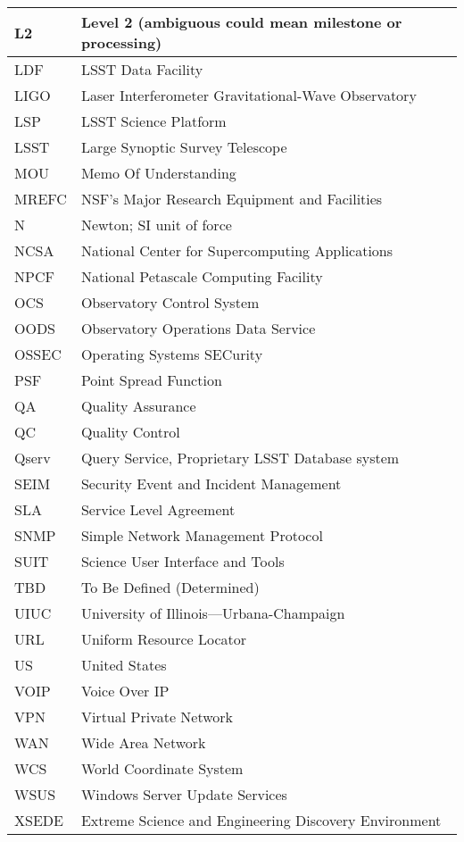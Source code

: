 \begin{longtable}{|l|p{}|}
L2 & Level 2 (ambiguous could mean milestone or processing) \\\hline
LDF & LSST Data Facility \\\hline
LIGO & Laser Interferometer Gravitational-Wave Observatory \\\hline
LSP & LSST Science Platform \\\hline
LSST & Large Synoptic Survey Telescope \\\hline
MOU & Memo Of Understanding \\\hline
MREFC & NSF's Major Research Equipment and Facilities \\\hline
N & Newton; SI unit of force \\\hline
NCSA & National Center for Supercomputing Applications \\\hline
NPCF & National Petascale Computing Facility \\\hline
OCS & Observatory Control System \\\hline
OODS & Observatory Operations Data Service \\\hline
OSSEC & Operating Systems SECurity \\\hline
PSF & Point Spread Function \\\hline
QA & Quality Assurance \\\hline
QC & Quality Control \\\hline
Qserv & Query Service, Proprietary LSST Database system \\\hline
SEIM & Security Event and Incident Management \\\hline
SLA & Service Level Agreement \\\hline
SNMP & Simple Network Management Protocol \\\hline
SUIT & Science User Interface and Tools \\\hline
TBD & To Be Defined (Determined) \\\hline
UIUC & University of Illinois—Urbana-Champaign \\\hline
URL & Uniform Resource Locator \\\hline
US & United States \\\hline
VOIP & Voice Over IP \\\hline
VPN & Virtual Private Network \\\hline
WAN & Wide Area Network \\\hline
WCS & World Coordinate System \\\hline
WSUS & Windows Server Update Services \\\hline
XSEDE & Extreme Science and Engineering Discovery Environment \\\hline
\end{longtable}

